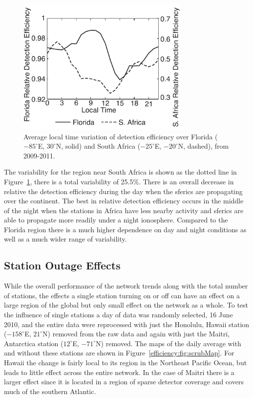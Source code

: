 \begin{figure}[ht!]
   \centering
\noindent\includegraphics[width=20pc]{efficiency/Figures/2012RS005049-f11.pdf} 
   \caption{Average local time variation of detection efficiency over Florida ($-85^\circ$E, $30^\circ$N, solid) and South Africa ($-25^\circ$E, $-20^\circ$N, dashed), from 2009-2011.}
   \label{efficiency:fig:deUTC}
\end{figure}

The variability for the region near South Africa is shown as the dotted line in Figure~\ref{efficiency:fig:deUTC}, there is a total variability of 25.5\%.
There is an overall decrease in relative the detection efficiency during the day when the sferics are propagating over the continent.
The best in relative detection efficiency occurs in the middle of the night when the stations in Africa have less nearby activity and sferics are able to propagate more readily under a night ionosphere.
Compared to the Florida region there is a much higher dependence on day and night conditions as well as a much wider range of variability.

\subsection{Station Outage Effects}

While the overall performance of the network trends along with the total number of stations, the effects  a single station turning on or off can have an effect on a large region of the global but only small effect on the network as a whole.
To test the influence of single stations a day of data was randomly selected, 16 June 2010, and the entire data were reprocessed with just the Honolulu, Hawaii station ($-158^\circ$E, $21^\circ$N) removed from the raw data and again with just the Maitri, Antarctica station ($12^\circ$E, $-71^\circ$N) removed.
The maps of the daily average with and without these stations are shown in Figure~\ref{efficiency:fig:scrubMap}.
For Hawaii the change is fairly local to its region in the Northeast Pacific Ocean, but leads to little effect across the entire network.
In the case of Maitri there is a larger effect since it is located in a region of sparse detector coverage and covers much of the southern Atlantic.

